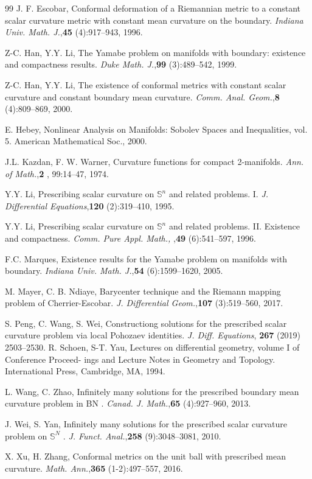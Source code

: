 \documentclass[11pt,a4paper]{amsart}
\begin{document}
\begin{thebibliography}{99}
J. F. Escobar, Conformal deformation of a Riemannian metric to a constant scalar curvature metric with constant mean curvature on the boundary. {\it Indiana Univ. Math. J.},{\bf 45} (4):917--943, 1996. 

Z-C. Han, Y.Y. Li, The Yamabe problem on manifolds with boundary: existence and compactness results. {\it Duke Math. J.},{\bf 99} (3):489--542, 1999. 

Z-C. Han, Y.Y. Li, The existence of conformal metrics with constant scalar curvature and constant boundary mean curvature. {\it Comm. Anal. Geom.},{\bf 8} (4):809--869, 2000. 

E. Hebey, Nonlinear Analysis on Manifolds: Sobolev Spaces and Inequalities, vol. 5. American Mathematical Soc., 2000.

J.L. Kazdan, F. W. Warner, Curvature functions for compact 2-manifolds. {\it Ann. of Math.},{\bf 2} , 99:14--47, 1974. 

Y.Y. Li, Prescribing scalar curvature on $\mathbb S^n$ and related problems. I. {\it J. Differential Equations},{\bf 120} (2):319--410, 1995. 

Y.Y. Li, Prescribing scalar curvature on $\mathbb S^n$ and related problems. II. Existence and compactness. {\it Comm. Pure Appl. Math.,
},{\bf  49} (6):541--597, 1996. 

F.C. Marques, Existence results for the Yamabe problem on manifolds with boundary. {\it Indiana Univ. Math. J.},{\bf 54} (6):1599--1620, 2005.

M. Mayer, C. B. Ndiaye, Barycenter technique and the Riemann mapping problem of Cherrier-Escobar. {\it J. Differential Geom.},{\bf 107} (3):519--560, 2017. 

S. Peng, C. Wang, S. Wei, Constructiong solutions for the prescribed scalar curvature problem via local Pohozaev identities. {\it J. Diff. Equations}, {\bf 267} (2019) 2503--2530.
R. Schoen, S-T. Yau, Lectures on differential geometry, volume I of Conference Proceed- ings and Lecture Notes in Geometry and Topology. International Press, Cambridge, MA, 1994.

L. Wang, C. Zhao, Infinitely many solutions for the prescribed boundary mean curvature problem in BN . {\it Canad. J. Math.},{\bf 65} (4):927--960, 2013. 

J. Wei, S. Yan, Infinitely many solutions for the prescribed scalar curvature problem on $\mathbb S^N$ . {\it J. Funct. Anal.},{\bf 258} (9):3048--3081, 2010. 

X. Xu, H. Zhang, Conformal metrics on the unit ball with prescribed mean curvature. {\it Math. Ann.},{\bf 365} (1-2):497--557, 2016.
\end{thebibliography}
\end{document}
